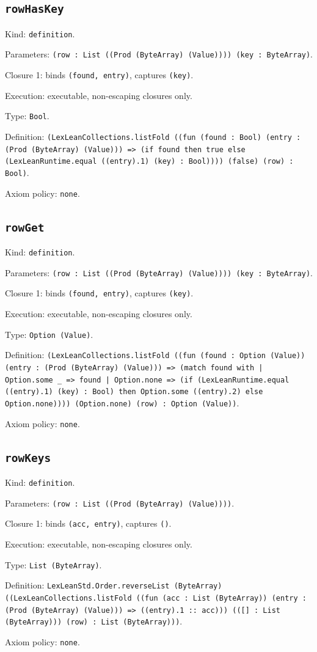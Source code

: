 \documentclass[11pt]{article}
\begin{document}
\subsection*{\texttt{rowHasKey}}
\noindent Kind: \texttt{definition}.\par
\noindent Parameters: \texttt{(row : List ((Prod (ByteArray) (Value)))) (key : ByteArray)}.\par
\noindent Closure 1: binds \texttt{(found, entry)}, captures \texttt{(key)}.\par
\noindent Execution: executable, non-escaping closures only.\par
\noindent Type: \texttt{Bool}.\par
\noindent Definition: \texttt{(LexLeanCollections.listFold ((fun (found : Bool) (entry : (Prod (ByteArray) (Value))) => (if found then true else (LexLeanRuntime.equal ((entry).1) (key) : Bool)))) (false) (row) : Bool)}.\par
\noindent Axiom policy: \texttt{none}.\par
\subsection*{\texttt{rowGet}}
\noindent Kind: \texttt{definition}.\par
\noindent Parameters: \texttt{(row : List ((Prod (ByteArray) (Value)))) (key : ByteArray)}.\par
\noindent Closure 1: binds \texttt{(found, entry)}, captures \texttt{(key)}.\par
\noindent Execution: executable, non-escaping closures only.\par
\noindent Type: \texttt{Option (Value)}.\par
\noindent Definition: \texttt{(LexLeanCollections.listFold ((fun (found : Option (Value)) (entry : (Prod (ByteArray) (Value))) => (match found with | Option.some \_ => found | Option.none => (if (LexLeanRuntime.equal ((entry).1) (key) : Bool) then Option.some ((entry).2) else Option.none)))) (Option.none) (row) : Option (Value))}.\par
\noindent Axiom policy: \texttt{none}.\par
\subsection*{\texttt{rowKeys}}
\noindent Kind: \texttt{definition}.\par
\noindent Parameters: \texttt{(row : List ((Prod (ByteArray) (Value))))}.\par
\noindent Closure 1: binds \texttt{(acc, entry)}, captures \texttt{()}.\par
\noindent Execution: executable, non-escaping closures only.\par
\noindent Type: \texttt{List (ByteArray)}.\par
\noindent Definition: \texttt{LexLeanStd.Order.reverseList (ByteArray) ((LexLeanCollections.listFold ((fun (acc : List (ByteArray)) (entry : (Prod (ByteArray) (Value))) => ((entry).1 :: acc))) (([] : List (ByteArray))) (row) : List (ByteArray)))}.\par
\noindent Axiom policy: \texttt{none}.\par
\end{document}
